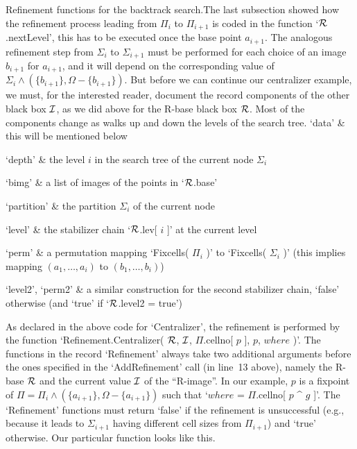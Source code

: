 \medskip
{\bsf Refinement  functions   for the  backtrack  search.}\quad  The last
subsection showed   how the refinement   process leading from  $\Pi_i$ to
$\Pi_{i+1}$  is coded in the  function  `${\cal R}$.nextLevel', this  has to be
executed once the  base point  $a_{i+1}$.  The analogous refinement  step
from $\Sigma_i$ to $\Sigma_{i+1}$ must be performed for each choice of an
image $b_{i+1}$ for  $a_{i+1}$, and it will  depend  on the corresponding
value of $\Sigma_i\wedge  (\{b_{i+1}\}, \Omega-\{b_{i+1}\})$. But  before
we  can continue  our centralizer example,  we  must,  for the interested
reader, document the record components of the other black box ${\cal I}$, as we
did above for the R-base black box ${\cal R}$. Most of the components change as
{\GAP} walks up and down the levels of the search tree.
\beginitems
`data' &
    this will be mentioned below

`depth' &
    the level $i$ in the search tree of the current node $\Sigma_i$

`bimg' &
    a list of images of the points in `${\cal R}$.base'

`partition' &
    the partition $\Sigma_i$ of the current node

`level' &
    the stabilizer chain `${\cal R}$.lev[ $i$ ]' at the current level

`perm' &
    a permutation mapping `Fixcells(  $\Pi_i$ )' to `Fixcells( $\Sigma_i$
    )' (this implies mapping $(a_1,\ldots,a_i)$ to $(b_1,\ldots,b_i)$)

`level2', `perm2' &
    a  similar construction for    the second stabilizer chain,   `false'
    otherwise (and `true' if `${\cal R}$.level2 = true')
\enditems

As declared in    the above code  for  `Centralizer',  the refinement  is
performed   by   the function     `Refinement.Centralizer(   ${\cal R}$,  ${\cal I}$,
$\Pi$.cellno[  $p$  ],  $p$,  $where$ )'.   The  functions in the  record
`Refinement' always   take two  additional   arguments  before  the  ones
specified  in  the `AddRefinement'  call (in  line~13 above),  namely the
R-base  ${\cal R}$ and  the  current  value  ${\cal I}$  of the ``R-image''.   In our
example,  $p$   is a   fixpoint  of   $\Pi= \Pi_i   \wedge  (\{a_{i+1}\},
\Omega-\{a_{i+1}\})$ such that `$where$ = $\Pi$.cellno[ $p$ ^ $g$ ]'. The
`Refinement'   functions   must  return `false'    if   the refinement is
unsuccessful (e.g., because it  leads to $\Sigma_{i+1}$ having  different
cell   sizes from  $\Pi_{i+1}$)  and  `true'  otherwise.   Our particular
function looks like this.

